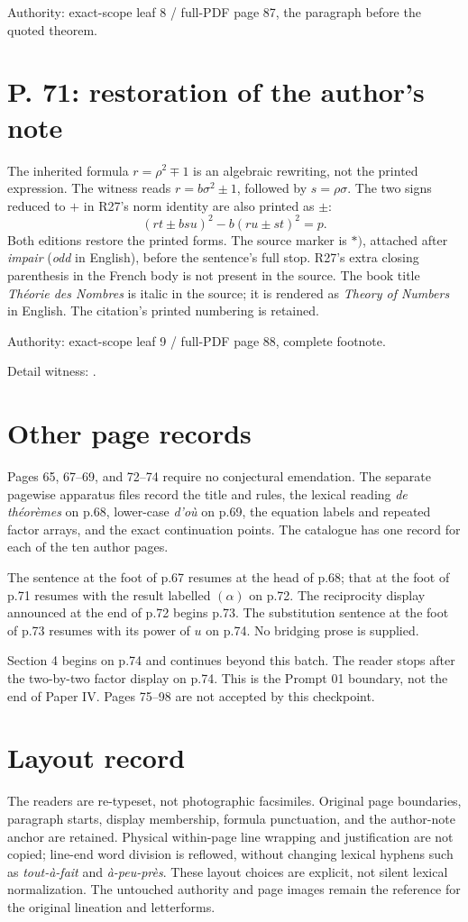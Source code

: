 \documentclass[11pt]{article}
\begin{document}
Authority: exact-scope leaf 8 / full-PDF page 87, the paragraph before the quoted theorem.

\newpage
\section*{P. 71: restoration of the author’s note}
The inherited formula $r=\rho^2\mp1$ is an algebraic rewriting, not the printed
expression. The witness reads $r=b\sigma^2\pm1$, followed by $s=\rho\sigma$.
The two signs reduced to $+$ in R27’s norm identity are also printed as $\pm$:
\[
(rt\pm bsu)^2-b(ru\pm st)^2=p.
\]
Both editions restore the printed forms. The source marker is $*)$, attached after
\emph{impair} (\emph{odd} in English), before the sentence’s full stop. R27’s extra
closing parenthesis in the French body is not present in the source. The book title
\emph{Théorie des Nombres} is italic in the source; it is rendered as
\emph{Theory of Numbers} in English. The citation’s printed numbering is retained.

Authority: exact-scope leaf 9 / full-PDF page 88, complete footnote.

Detail witness: .

\section*{Other page records}
Pages 65, 67–69, and 72–74 require no conjectural emendation. The separate pagewise
apparatus files record the title and rules, the lexical reading \emph{de théorèmes}
on p.68, lower-case \emph{d’où} on p.69, the equation labels and repeated factor
arrays, and the exact continuation points. The catalogue has one record for each
of the ten author pages.

The sentence at the foot of p.67 resumes at the head of p.68; that at the foot of
p.71 resumes with the result labelled $(\alpha)$ on p.72. The reciprocity display
announced at the end of p.72 begins p.73. The substitution sentence at the foot of
p.73 resumes with its power of $u$ on p.74. No bridging prose is supplied.

Section 4 begins on p.74 and continues beyond this batch. The reader stops after
the two-by-two factor display on p.74. This is the Prompt 01 boundary, not the end
of Paper IV. Pages 75–98 are not accepted by this checkpoint.

\section*{Layout record}
The readers are re-typeset, not photographic facsimiles. Original page boundaries,
paragraph starts, display membership, formula punctuation, and the author-note
anchor are retained. Physical within-page line wrapping and justification are not
copied; line-end word division is reflowed, without changing lexical hyphens such
as \emph{tout-à-fait} and \emph{à-peu-près}. These layout choices are explicit, not
silent lexical normalization. The untouched authority and page images remain the
reference for the original lineation and letterforms.
\end{document}

